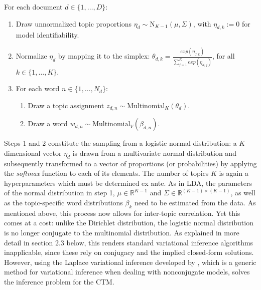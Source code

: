 \documentclass[12pt]{article}
\begin{document}
\vspace{0.25cm}
\noindent
For each document $d \in \{1,\dots,D\}$:

\begin{enumerate}[{1)}]
\vspace{-0.25cm}
\item Draw unnormalized topic proportions $\eta_d \sim \text{N}_{K-1}(\mu, \Sigma)$, with $\eta_{d,k} := 0$ for model identifiability.
\vspace{-0.25cm}
\item Normalize $\eta_d$ by mapping it to the simplex: $\theta_{d,k} = \frac{exp(\eta_{d,k})}{\sum_{j=1}^{K}exp(\eta_{d,j})}$, for all $k \in \{1,\dots,K\}$.
\vspace{-0.25cm}
\item For each word $n \in \{1,\dots,N_d\}$:
	\begin{enumerate}[{a)}]
	\vspace{-0.25cm}    
    \item Draw a topic assignment $z_{d,n} \sim \text{Multinomial}_K(\theta_d)$.
	\vspace{-0.25cm}    
    \item Draw a word $w_{d,n} \sim \text{Multinomial}_V(\beta_{d,n})$.
	\end{enumerate}
\end{enumerate}

\noindent
Steps 1 and 2 constitute the sampling from a logistic normal distribution: a $K$-dimensional vector $\eta_d$ is drawn from a multivariate normal distribution and subsequently transformed to a vector of proportions (or probabilities) by applying the \textit{softmax} function to each of its elements. The number of topics $K$ is again a hyperparameters which must be determined ex ante. As in LDA, the parameters of the normal distribution in step 1, $\mu \in \mathbb{R}^{K-1}$ and $\Sigma \in \mathbb{R}^{(K-1) \times (K-1)}$, as well as the topic-specific word distributions $\beta_k$ need to be estimated from the data. As mentioned above, this process now allows for inter-topic correlation. Yet this comes at a cost: unlike the Dirichlet distribution, the logistic normal distribution is no longer conjugate to the multinomial distribution. As explained in more detail in section 2.3 below, this renders standard variational inference algorithms inapplicable, since these rely on conjugacy and the implied closed-form solutions. However, using the Laplace variational inference developed by \cite{wang2013variational}, which is a generic method for variational inference when dealing with nonconjugate models, solves the inference problem for the CTM.
\end{document}
